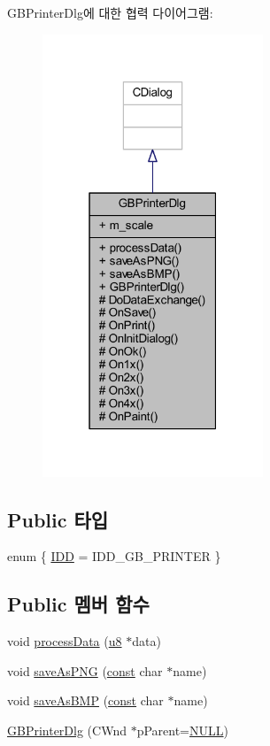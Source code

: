G\+B\+Printer\+Dlg에 대한 협력 다이어그램\+:\nopagebreak
\begin{figure}[H]
\begin{center}
\leavevmode
\includegraphics[width=187pt]{class_g_b_printer_dlg__coll__graph}
\end{center}
\end{figure}
\subsection*{Public 타입}
\begin{DoxyCompactItemize}
\item 
enum \{ \mbox{\hyperlink{class_g_b_printer_dlg_a1651cac3900d0c9e28bfdb591965155ba37cb81fc068496229b79d232b4279f6b}{I\+DD}} = I\+D\+D\+\_\+\+G\+B\+\_\+\+P\+R\+I\+N\+T\+ER
 \}
\end{DoxyCompactItemize}
\subsection*{Public 멤버 함수}
\begin{DoxyCompactItemize}
\item 
void \mbox{\hyperlink{class_g_b_printer_dlg_a9dcd976e6386374b0f2c70af0b09a43e}{process\+Data}} (\mbox{\hyperlink{_system_8h_aed742c436da53c1080638ce6ef7d13de}{u8}} $\ast$data)
\item 
void \mbox{\hyperlink{class_g_b_printer_dlg_ad776132a614d5e3bec1567f38d9c5d9c}{save\+As\+P\+NG}} (\mbox{\hyperlink{getopt1_8c_a2c212835823e3c54a8ab6d95c652660e}{const}} char $\ast$name)
\item 
void \mbox{\hyperlink{class_g_b_printer_dlg_a49404740bed8928cf83d77acb9dcaf83}{save\+As\+B\+MP}} (\mbox{\hyperlink{getopt1_8c_a2c212835823e3c54a8ab6d95c652660e}{const}} char $\ast$name)
\item 
\mbox{\hyperlink{class_g_b_printer_dlg_af449afffcd0cad3eb2fc1240a0aedf35}{G\+B\+Printer\+Dlg}} (C\+Wnd $\ast$p\+Parent=\mbox{\hyperlink{_system_8h_a070d2ce7b6bb7e5c05602aa8c308d0c4}{N\+U\+LL}})
\end{DoxyCompactItemize}

